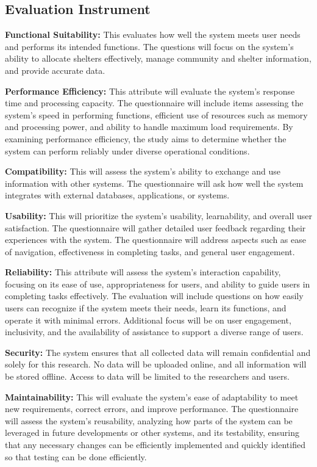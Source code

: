 \subsection{Evaluation Instrument}
	\textbf{Functional Suitability:} This evaluates how well the system meets user needs and performs its intended functions. The questions will focus on the system's ability to allocate shelters effectively, manage community and shelter information, and provide accurate data.
	
	\textbf{Performance Efficiency:} This attribute will evaluate the system's response time and processing capacity. The questionnaire will include items assessing the system's speed in performing functions, efficient use of resources such as memory and processing power, and ability to handle maximum load requirements. By examining performance efficiency, the study aims to determine whether the system can perform reliably under diverse operational conditions.
	
	\textbf{Compatibility:} This will assess the system’s ability to exchange and use information with other systems. The questionnaire will ask how well the system integrates with external databases, applications, or systems. 
	
	\textbf{Usability:} This will prioritize the system's usability, learnability, and overall user satisfaction. The questionnaire will gather detailed user feedback regarding their experiences with the system. The questionnaire will address aspects such as ease of navigation, effectiveness in completing tasks, and general user engagement.
	
	\textbf{Reliability:} This attribute will assess the system's interaction capability, focusing on its ease of use, appropriateness for users, and ability to guide users in completing tasks effectively. The evaluation will include questions on how easily users can recognize if the system meets their needs, learn its functions, and operate it with minimal errors. Additional focus will be on user engagement, inclusivity, and the availability of assistance to support a diverse range of users. 
	
	\textbf{Security:} The system ensures that all collected data will remain confidential and solely for this research. No data will be uploaded online, and all information will be stored offline. Access to data will be limited to the researchers and users.
	
	\textbf{Maintainability:} This will evaluate the system's ease of adaptability to meet new requirements, correct errors, and improve performance. The questionnaire will assess the system's reusability, analyzing how parts of the system can be leveraged in future developments or other systems, and its testability, ensuring that any necessary changes can be efficiently implemented and quickly identified so that testing can be done efficiently. 

